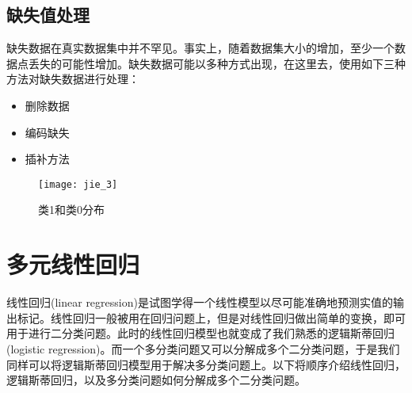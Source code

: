 \documentclass[withoutpreface,bwprint]{cumcmthesis} %
\begin{document}
	\subsection{缺失值处理}
	\par 缺失数据在真实数据集中并不罕见。事实上，随着数据集大小的增加，至少一个数据点丢失的可能性增加。缺失数据可能以多种方式出现，在这里去，使用如下三种方法对缺失数据进行处理：
		\begin{itemize}
		\item 删除数据
		\item 编码缺失
		\item 插补方法
	\end{itemize}
	
	
	
			\begin{figure}[H]
		\centering
		\centerline{\texttt{[image: jie\_3]}}  
		\begin{center}
			\caption{类1和类0分布}
		\end{center}
	\end{figure}
	
	
\section{多元线性回归}
\par 线性回归(linear regression)是试图学得一个线性模型以尽可能准确地预测实值的输出标记。线性回归一般被用在回归问题上，但是对线性回归做出简单的变换，即可用于进行二分类问题。此时的线性回归模型也就变成了我们熟悉的逻辑斯蒂回归(logistic regression)。而一个多分类问题又可以分解成多个二分类问题，于是我们同样可以将逻辑斯蒂回归模型用于解决多分类问题上。以下将顺序介绍线性回归，逻辑斯蒂回归，以及多分类问题如何分解成多个二分类问题。
\end{document}
